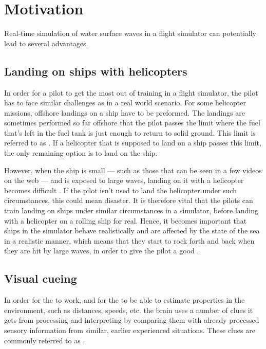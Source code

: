 \chapter{Motivation}

Real-time simulation of water surface waves in a flight simulator can potentially lead to several advantages.

\section{Landing on ships with helicopters}

In order for a pilot to get the most out of training in a flight simulator, the pilot has to face similar challenges as in a real world scenario. For some helicopter missions, offshore landings on a ship have to be preformed. The landings are sometimes performed so far offshore that the pilot passes the limit where the fuel that's left in the fuel tank is just enough to return to solid ground. This limit is referred to as . If a helicopter that is supposed to land on a ship passes this limit, the only remaining option is to land on the ship.

However, when the ship is small --- such as those that can be seen in a few videos on the web \citep{MrOawal2009,PrismDefence2010,KopulaDK2010} --- and is exposed to large waves, landing on it with a helicopter becomes difficult \citep{PrismDefence2010}. If the pilot isn't used to land the helicopter under such circumstances, this could mean disaster. It is therefore vital that the pilots can train landing on ships under similar circumstances in a simulator, before landing with a helicopter on a rolling ship for real. Hence, it becomes important that ships in the simulator behave realistically and are affected by the state of the sea in a realistic manner, which means that they start to rock forth and back when they are hit by large waves, in order to give the pilot a good .

\section{Visual cueing}

In order for the  to work, and for the \brain to be able to estimate properties in the environment, such as distances, speeds, etc. the brain uses a number of clues it gets from processing and interpreting  by comparing them with already processed sensory information from similar, earlier experienced situations. These clues are commonly referred to as .

